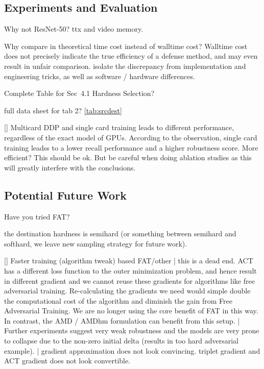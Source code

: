\subsection{Experiments and Evaluation}


	 Why not ResNet-50?
		ttx and video memory.

	 Why compare in theoretical time cost instead of walltime cost?
		Walltime cost does not precisely indicate the true efficiency
		of a defense method, and may even result in unfair comparison.
		isolate the discrepancy from implementation and engineering tricks,
		as well as software / hardware differences.

	 Complete Table for Sec~4.1 Hardness Selection?

	 full data sheet for tab 2?
		\cref{tab:srcdest}

	[\xmark] Multicard DDP and single card training leads to different
		performance, regardless of the exact model of GPUs.
		According to the observation, single card training leadss to a lower
		recall performance and a higher robustness score.
		More efficient? This should be ok.
		But be careful when doing ablation studies as this will greatly
		interfere with the conclusions.
	
\subsection{Potential Future Work}

	 Have you tried FAT?

	 the destination hardness is semihard (or something between semihard
		and softhard, we leave new sampling strategy for future work).

	 [\xmark] Faster training (algorithm tweak) based FAT/other | this is
		a dead end. ACT has a different loss function to the outer minimization
		problem, and hence result in different gradient and we cannot reuse
		these gradients for algorithms like free adversarial training.
		Re-calculating the gradients we need would simple double the
		computational cost of the algorithm and diminish the gain from Free
		Adversarial Training. We are no longer using the core benefit of FAT in
		this way. In contrast, the AMD / AMDhm formulation can benefit from
		this setup. | Further experiments suggest very weak robustness and the
		models are very prone to collapse due to the non-zero initial delta
		(results in too hard adversarial example).  | gradient approximation
		does not look convincing. triplet gradient and ACT gradient does not
		look convertible.

